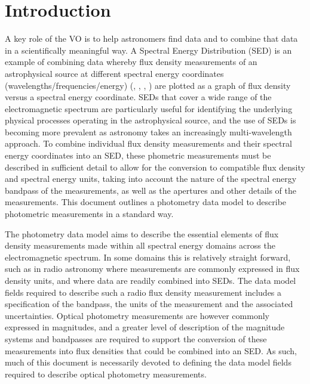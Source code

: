 \documentclass[11pt,a4paper]{ivoa}
\begin{document}
\section{Introduction}
A key role of the VO is to help astronomers find data and to 
combine that data in a scientifically meaningful way. A Spectral 
Energy Distribution (SED) is an example of combining data whereby 
flux density measurements of an astrophysical source at different 
spectral energy coordinates (wavelengths/frequencies/energy)
(\citep{doi:10.1146/annurev.astro.41.082801.100251}, 
\citep{longo}, \citep{connell}, \citep{brujine}) are plotted as a 
graph of flux density versus a spectral energy coordinate. SEDs that 
cover a wide range of the electromagnetic spectrum are particularly 
useful for identifying the underlying physical processes operating 
in the astrophysical source, and the use of SEDs is becoming more 
prevalent as astronomy takes an increasingly multi-wavelength 
approach. To combine individual flux density measurements and their 
spectral energy coordinates into an SED, these phometric measurements 
must be described in sufficient detail to allow for the conversion to 
compatible flux density and spectral energy units,  taking into 
account the nature of the spectral energy bandpass of the measurements, 
as well as the apertures and other details of  the measurements. 
This document outlines a photometry data model to describe photometric 
measurements in a standard way.

The photometry data model aims to describe the essential elements 
of flux density measurements made within all spectral energy domains 
across the electromagnetic spectrum. In some domains this is 
relatively straight forward, such as in radio astronomy where 
measurements are commonly expressed in flux density units, and 
where data are readily combined into SEDs. The data model fields 
required to describe such a radio flux density measurement includes 
a specification of the bandpass, the units of the measurement and 
the associated uncertainties. Optical photometry measurements are 
however commonly expressed in magnitudes, and a greater level of 
description of the magnitude systems and bandpasses are required 
to support the conversion of these measurements into flux densities 
that could be combined into an SED. As such, much of this document 
is necessarily devoted to defining the data model fields required 
to describe optical photometry measurements.
\end{document}
